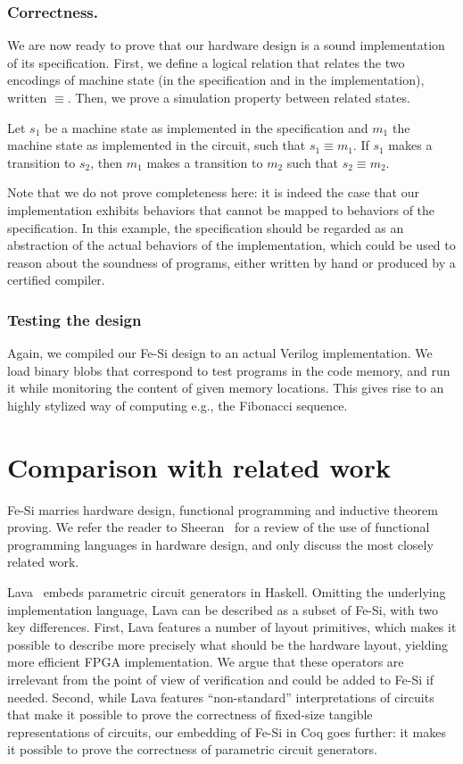 \documentclass{llncs}
\begin{document}
\subsubsection{Correctness.} We are now ready to prove that our
hardware design is a sound implementation of its specification. 
%
First, we define a logical relation that relates the two
encodings of machine state (in the specification and in the
implementation), written $\equiv$. 
%
Then, we prove a simulation property between related states.
\begin{theorem}
  Let $s_1$ be a machine state as implemented in the specification and
  $m_1$ the machine state as implemented in the circuit, such that
  $s_1 \equiv m_1$.
%
  If $s_1$ makes a transition to $s_2$, then $m_1$ makes a transition
  to $m_2$ such that $s_2 \equiv m_2$.
\end{theorem}
Note that we do not prove completeness here: it is indeed the case
that our implementation exhibits behaviors that cannot be mapped to
behaviors of the specification. 
%
In this example, the specification should be regarded as an
abstraction of the actual behaviors of the implementation, which could
be used to reason about the soundness of programs, either written by
hand or produced by a certified compiler.
%

\subsubsection{Testing the design}
Again, we compiled our Fe-Si design to an actual Verilog
implementation. We load binary blobs that correspond to test programs
in the code memory, and run it while monitoring the content of given
memory locations. This gives rise to an highly stylized way of
computing e.g., the Fibonacci sequence.

\section{Comparison with related work}\label{sec:rw}
Fe-Si marries hardware design, functional programming and inductive
theorem proving.
%
We refer the reader to Sheeran~\cite{DBLP:journals/jucs/Sheeran05} for
a review of the use of functional programming languages in hardware
design, and only discuss the most closely related work.

\medskip

Lava~\cite{Bjesse98lava:hardware} embeds parametric circuit generators
in Haskell. 
%
Omitting the underlying implementation language, Lava can be described
as a subset of Fe-Si, with two key differences.
%
First, Lava features a number of layout primitives, which makes it
possible to describe more precisely what should be the hardware
layout, yielding more efficient FPGA implementation. We argue that
these operators are irrelevant from the point of view of verification
and could be added to Fe-Si if needed.
%
Second, while Lava features ``non-standard'' interpretations of
circuits that make it possible to prove the correctness of fixed-size
tangible representations of circuits, our embedding of Fe-Si in Coq
goes further: it makes it possible to prove the correctness of
parametric circuit generators.
\end{document}

